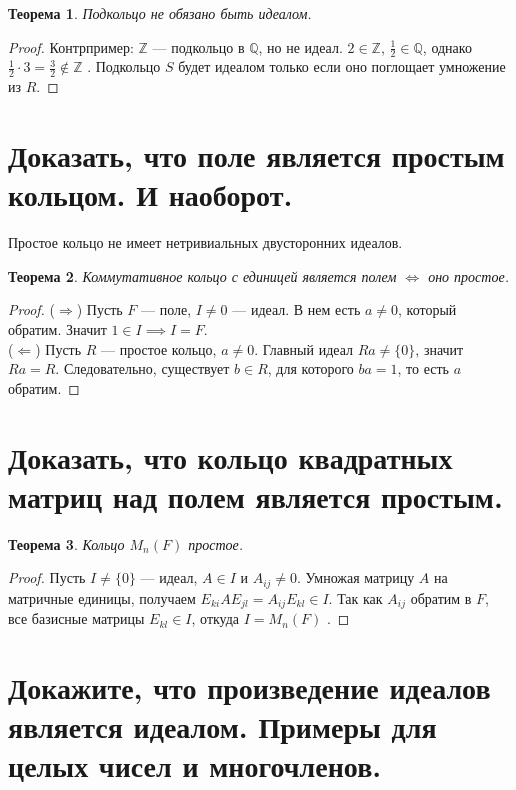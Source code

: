 \documentclass[12pt, a4paper]{article}
\theoremstyle{definition}
\theoremstyle{plain}
\newtheorem{theorem}{Теорема}[section]
\begin{document}
	\begin{theorem}
		Подкольцо не обязано быть идеалом.
	\end{theorem}
	\begin{proof}
		Контрпример: $\mathbb{Z}$ — подкольцо в $\mathbb{Q}$, но не идеал. $2 \in \mathbb{Z}$, $\frac{1}{2} \in \mathbb{Q}$, однако $\frac{1}{2} \cdot 3 = \frac{3}{2} \notin \mathbb{Z}$ . Подкольцо $S$ будет идеалом только если оно поглощает умножение из $R$.
	\end{proof}
	
	\newpage
	
	\section{Доказать, что поле является простым кольцом. И наоборот.}
	
	Простое кольцо не имеет нетривиальных двусторонних идеалов.
	
	\begin{theorem}
		Коммутативное кольцо с единицей является полем $\iff$ оно простое.
	\end{theorem}
	\begin{proof}
		($\Rightarrow$) Пусть $F$ — поле, $I \neq 0$ — идеал. В нем есть $a \neq 0$, который обратим. Значит $1 \in I \implies I=F$. \\
		($\Leftarrow$) Пусть $R$ — простое кольцо, $a \neq 0$. Главный идеал $Ra \neq \{0\}$, значит $Ra=R$. Следовательно, существует $b \in R$, для которого $ba=1$, то есть $a$ обратим.
	\end{proof}
	
	\newpage
	
	\section{Доказать, что кольцо квадратных матриц над полем является простым.}
	
	\begin{theorem}
		Кольцо $M_n(F)$ простое.
	\end{theorem}
	\begin{proof}
		Пусть $I \neq \{0\}$ — идеал, $A \in I$ и $A_{ij} \neq 0$. Умножая матрицу $A$ на матричные единицы, получаем $E_{ki} A E_{jl} = A_{ij} E_{kl} \in I$. Так как $A_{ij}$ обратим в $F$, все базисные матрицы $E_{kl} \in I$, откуда $I = M_n(F)$ .
	\end{proof}
	
	\newpage
	
	\section{Докажите, что произведение идеалов является идеалом. Примеры для целых чисел и многочленов.}
	
\end{document}

